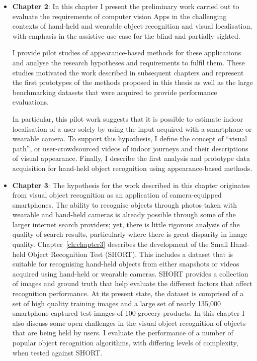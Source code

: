 \begin{itemize}

\item \textbf{Chapter 2}: In this chapter I present the preliminary work carried out to evaluate the requirements of computer vision Apps in the challenging contexts of hand-held and wearable object recognition and visual localisation, with emphasis in the assistive use case for the blind and partially sighted. %

I provide pilot studies of appearance-based methods for these applications and analyse the research hypotheses and requirements to fulfil them. These studies motivated the work described in subsequent chapters and represent the first prototypes of the methods proposed in this thesis as well as the large benchmarking datasets that were acquired to provide performance evaluations.

In particular, this pilot work suggests that it is possible to estimate indoor localisation of a user solely by using the input acquired with a smartphone or wearable camera. To support this hypothesis, I define the concept of ``visual path'', or user-crowdsourced videos of indoor journeys and their descriptions of visual appearance. Finally, I describe the first analysis and prototype data acquisition for hand-held object recognition using appearance-based methods.


\item \textbf{Chapter 3}: The hypothesis for the work described in this chapter originates from visual object recognition as an application of camera-equipped smartphones. The ability to recognise objects through photos taken with wearable and hand-held cameras is already possible through some of the larger internet search providers; yet, there is little rigorous analysis of the quality of search results, particularly where there is great disparity in image quality. Chapter~\ref{ch:chapter3} describes the development of the Small Hand-held Object Recognition Test (SHORT). This includes a dataset that is suitable for recognising hand-held objects from either snapshots or videos acquired using hand-held or wearable cameras. SHORT provides a collection of images and ground truth that help evaluate the different factors that affect recognition performance. At its present state, the dataset is comprised of a set of high quality training images and a large set of nearly 135,000 smartphone-captured test images of 100 grocery products. In this chapter I also discuss some open challenges in the visual object recognition of objects that are being held by users. I evaluate the performance of a number of popular object recognition algorithms, with differing levels of complexity, when tested against SHORT.


\end{itemize}

